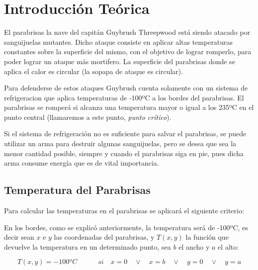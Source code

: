 \section{Introducción Teórica}
%

El parabrisas la nave del capitán Guybrush Threepwood está siendo atacado por sanguijuelas mutantes. Dicho ataque consiste en aplicar altas temperaturas constantes sobre la superficie del mismo, con el objetivo de lograr romperlo, para poder lograr un ataque más mortifero. La superficie del parabrisas donde se aplica el calor es circular (la sopapa de ataque es circular).

Para defenderse de estos ataques Guybrush cuenta solamente con un sistema de refrigeracion que aplica temperaturas de -100ºC a los bordes del parabrisas. El parabrisas se romperá si alcanza una temperatura mayor o igual a los 235ºC en el punto central (llamaremos a este punto, \textit{punto crítico}).

Si el sistema de refrigeración no es suficiente para salvar el parabrisas, se puede utilizar un arma para destruir algunas sanguijuelas, pero se desea que sea la menor cantidad posible, siempre y cuando el parabrisas siga en pie, pues dicha arma consume energía que es de vital importancia.







\subsection{Temperatura del Parabrisas}

Para calcular las temperaturas en el parabrisas se aplicará el siguiente criterio: 

En los bordes, como se explicó anteriormente, la temperatura será de -100ºC, es decir sean $x$ e $y$ las coordenadas del parabrisas, y $T(x,y)$ la función que devuelve la temperatura en un determinado punto, sea $b$ el ancho y $a$ el alto:

\begin{equation}
T(x,y)=-100ºC 	\quad	\quad	 \quad si \quad x=0 \quad \vee \quad x=b \quad \vee \quad y=0 \quad \vee \quad y=a
\end{equation}\\



